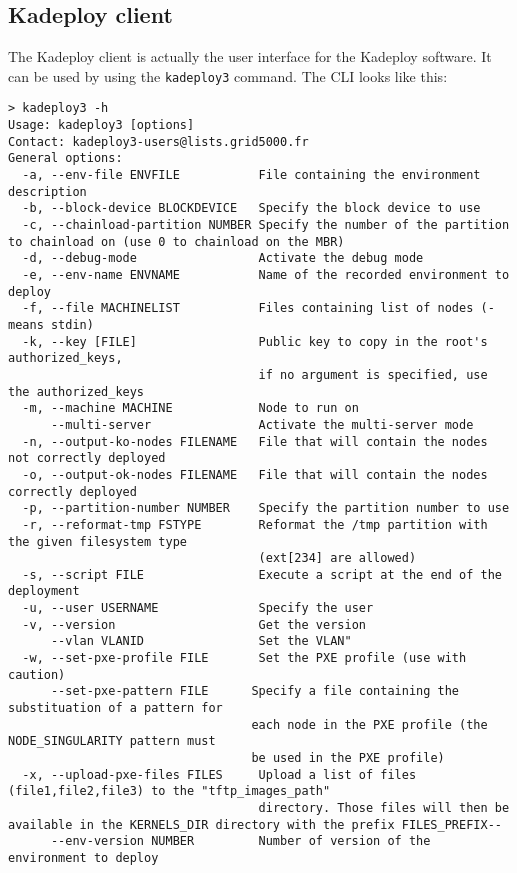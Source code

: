 \documentclass[a4wide,10pt,oneside]{book}
\begin{document}
\subsection{Kadeploy client}\label{sec:kadeploy_client}
The Kadeploy client is actually the user interface for the Kadeploy software. It can be used by using the \texttt{kadeploy3} command. The CLI looks like this:
\begin{small}
\begin{verbatim}
> kadeploy3 -h
Usage: kadeploy3 [options]
Contact: kadeploy3-users@lists.grid5000.fr
General options:
  -a, --env-file ENVFILE           File containing the environment description
  -b, --block-device BLOCKDEVICE   Specify the block device to use
  -c, --chainload-partition NUMBER Specify the number of the partition to chainload on (use 0 to chainload on the MBR)
  -d, --debug-mode                 Activate the debug mode
  -e, --env-name ENVNAME           Name of the recorded environment to deploy
  -f, --file MACHINELIST           Files containing list of nodes (- means stdin)
  -k, --key [FILE]                 Public key to copy in the root's authorized_keys, 
                                   if no argument is specified, use the authorized_keys
  -m, --machine MACHINE            Node to run on
      --multi-server               Activate the multi-server mode
  -n, --output-ko-nodes FILENAME   File that will contain the nodes not correctly deployed
  -o, --output-ok-nodes FILENAME   File that will contain the nodes correctly deployed
  -p, --partition-number NUMBER    Specify the partition number to use
  -r, --reformat-tmp FSTYPE        Reformat the /tmp partition with the given filesystem type
                                   (ext[234] are allowed)
  -s, --script FILE                Execute a script at the end of the deployment
  -u, --user USERNAME              Specify the user
  -v, --version                    Get the version
      --vlan VLANID                Set the VLAN"
  -w, --set-pxe-profile FILE       Set the PXE profile (use with caution)
      --set-pxe-pattern FILE      Specify a file containing the substituation of a pattern for 
                                  each node in the PXE profile (the NODE_SINGULARITY pattern must
                                  be used in the PXE profile)
  -x, --upload-pxe-files FILES     Upload a list of files (file1,file2,file3) to the "tftp_images_path"
                                   directory. Those files will then be available in the KERNELS_DIR directory with the prefix FILES_PREFIX--
      --env-version NUMBER         Number of version of the environment to deploy

\end{verbatim}
\end{small}
\end{document}
